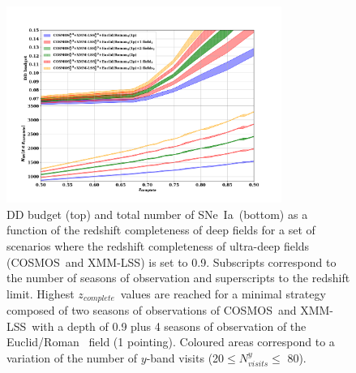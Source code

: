 \documentclass[skiphelvet,twocolumn]{aastex63}
\newcommand{\cosmos}{{COSMOS}}
\newcommand{\xmm}{{XMM-LSS}}
\newcommand{\adfs}{{Euclid/Roman}}
\newcommand{\sne}{{SNe~Ia}}
\newcommand{\zcomp}{\mbox{$z_{complete}$}}
\begin{document}
\begin{figure}[htbp]
\begin{center}
  \includegraphics[width=0.8\textwidth]{budget_zcomp.png}
  \caption{DD budget (top) and total number of \sne~(bottom) as a function of the redshift completeness of deep fields for a set of scenarios where the redshift completeness of ultra-deep fields (\cosmos~and \xmm) is set to 0.9. Subscripts correspond to the number of seasons of observation and superscripts to the redshift limit. Highest \zcomp~values are reached for a minimal strategy composed of two seasons of observations of \cosmos~and \xmm~with a depth of 0.9 plus 4 seasons of observation of the \adfs~ field (1 pointing). Coloured areas correspond to a variation of the number of $y$-band visits (20$\leq N_{visits}^y \leq$ 80).}\label{fig:budget_zcomp}
\end{center}
\end{figure}
\end{document}
